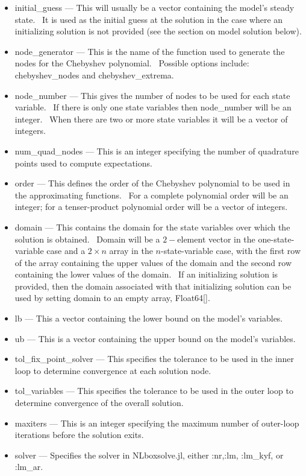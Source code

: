 \documentclass[notitlepage,11pt]{article}
\begin{document}
\begin{itemize}
\item initial\_guess --- This will usually be a vector containing the
model's steady state. \ It is used as the initial guess at the solution in
the case where an initializing solution is not provided (see the section on
model solution below).

\item node\_generator --- This is the name of the function used to generate
the nodes for the Chebyshev polynomial. \ Possible options include:
chebyshev\_nodes and chebyshev\_extrema.

\item node\_number --- This gives the number of nodes to be used for each
state variable. \ If there is only one state variables then node\_number
will be an integer. \ When there are two or more state variables it will be
a vector of integers.

\item num\_quad\_nodes --- This is an integer specifying the number of
quadrature points used to compute expectations.

\item order --- This defines the order of the Chebyshev polynomial to be
used in the approximating functions. \ For a complete polynomial order will
be an integer; for a tenser-product polynomial order will be a vector of
integers.

\item domain --- This contains the domain for the state variables over which
the solution is obtained. \ Domain will be a $2-$element vector in the
one-state-variable case and a $2\times n$ array in the $n$-state-variable
case, with the first row of the array containing the upper values of the
domain and the second row containing the lower values of the domain. \ If an
initializing solution is provided, then the domain associated with that
initializing solution can be used by setting domain to an empty array,
Float64[].

\item lb --- This a vector containing the lower bound on the model's
variables.

\item ub --- This is a vector containing the upper bound on the model's
variables.

\item tol\_fix\_point\_solver --- This specifies the tolerance to be used in
the inner loop to determine convergence at each solution node.

\item tol\_variables --- This specifies the tolerance to be used in the
outer loop to determine convergence of the overall solution.

\item maxiters --- This is an integer specifying the maximum number of
outer-loop iterations before the solution exits.

\item solver --- Specifies the solver in NLboxsolve.jl, either :nr,:lm,
:lm\_kyf, or :lm\_ar.
\end{itemize}
\end{document}
